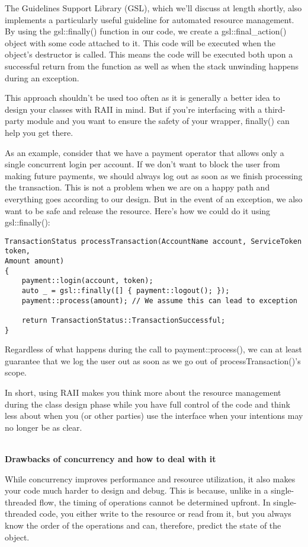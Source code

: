 The Guidelines Support Library (GSL), which we'll discuss at length shortly, also implements a particularly useful guideline for automated resource management. By using the gsl::finally() function in our code, we create a gsl::final\_action() object with some code attached to it. This code will be executed when the object's destructor is called. This means the code will be executed both upon a successful return from the function as well as when the stack unwinding happens during an exception.

This approach shouldn't be used too often as it is generally a better idea to design your classes with RAII in mind. But if you're interfacing with a third-party module and you want to ensure the safety of your wrapper, finally() can help you get there.

As an example, consider that we have a payment operator that allows only a single concurrent login per account. If we don't want to block the user from making future payments, we should always log out as soon as we finish processing the transaction. This is not a problem when we are on a happy path and everything goes according to our design. But in the event of an exception, we also want to be safe and release the resource. Here's how we could do it using gsl::finally():

\begin{lstlisting}[style=styleCXX]
TransactionStatus processTransaction(AccountName account, ServiceToken
token,
Amount amount)
{
	payment::login(account, token);
	auto _ = gsl::finally([] { payment::logout(); });
	payment::process(amount); // We assume this can lead to exception
	
	return TransactionStatus::TransactionSuccessful;
}
\end{lstlisting}

Regardless of what happens during the call to payment::process(), we can at least guarantee that we log the user out as soon as we go out of processTransaction()'s scope.

In short, using RAII makes you think more about the resource management during the class design phase while you have full control of the code and think less about when you (or other parties) use the interface when your intentions may no longer be as clear.

\hspace*{\fill} \\ %
\noindent
\textbf{Drawbacks of concurrency and how to deal with it}

While concurrency improves performance and resource utilization, it also makes your code much harder to design and debug. This is because, unlike in a single-threaded flow, the timing of operations cannot be determined upfront. In single-threaded code, you either write to the resource or read from it, but you always know the order of the operations and can, therefore, predict the state of the object.

